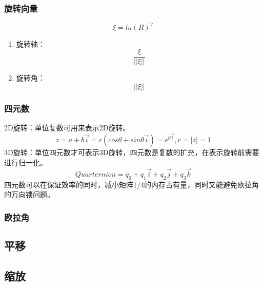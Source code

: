 \subsubsection{旋转向量} 
\begin{equation} \xi = ln(R)^{\vee} \end{equation}
\begin{enumerate}
\item 旋转轴：\begin{equation} \frac{\xi}{||\xi||}  \end{equation}
\item 旋转角：\begin{equation} ||\xi||  \end{equation}
\end{enumerate}

\subsubsection{四元数} 
2D旋转：单位复数可用来表示2D旋转。  \\
\begin{equation} 
z = a + b\vec{i} = r ( cos\theta + sin\theta\vec{i} ) = e^{\theta \vec{i}}, r = |z| = 1
\end{equation}
3D旋转：单位四元数才可表示3D旋转，四元数是复数的扩充，在表示旋转前需要进行归一化。 \\
\begin{equation} 
Quarternion = q_0 + q_1\vec{i} + q_2\vec{j} + q_3\vec{k}  
\end{equation} 
四元数可以在保证效率的同时，减小矩阵1/4的内存占有量，同时又能避免欧拉角的万向锁问题。

\subsubsection{欧拉角} 


\subsection{平移}

\subsection{缩放}